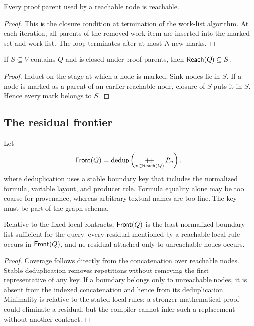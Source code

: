 \begin{lemma}
Every proof parent used by a reachable node is reachable.
\end{lemma}

\begin{proof}
This is the closure condition at termination of the work-list algorithm.  At each iteration, all parents of the removed work item are inserted into the marked set and work list.  The loop terminates after at most \(N\) new marks.
\end{proof}

\begin{lemma}\label{lem:reach-min}
If \(S\subseteq V\) contains \(Q\) and is closed under proof parents, then
\(\mathsf{Reach}(Q)\subseteq S\).
\end{lemma}

\begin{proof}
Induct on the stage at which a node is marked.  Sink nodes lie in \(S\).  If a node is marked as a parent of an earlier reachable node, closure of \(S\) puts it in \(S\).  Hence every mark belongs to \(S\).
\end{proof}

\subsection{The residual frontier}

Let
\[
       \mathsf{Front}(Q)=\operatorname{dedup}
          \left(\mathop{+\!+}_{v\in\mathsf{Reach}(Q)}R_v\right),
\]
where deduplication uses a stable boundary key that includes the normalized formula, variable layout, and producer role.  Formula equality alone may be too coarse for provenance, whereas arbitrary textual names are too fine.  The key must be part of the graph schema.

\begin{theorem}\label{thm:least-frontier}
Relative to the fixed local contracts, \(\mathsf{Front}(Q)\) is the least normalized boundary list sufficient for the query: every residual mentioned by a reachable local rule occurs in \(\mathsf{Front}(Q)\), and no residual attached only to unreachable nodes occurs.
\end{theorem}

\begin{proof}
Coverage follows directly from the concatenation over reachable nodes.  Stable deduplication removes repetitions without removing the first representative of any key.  If a boundary belongs only to unreachable nodes, it is absent from the indexed concatenation and hence from its deduplication.  Minimality is relative to the stated local rules: a stronger mathematical proof could eliminate a residual, but the compiler cannot infer such a replacement without another contract.
\end{proof}

